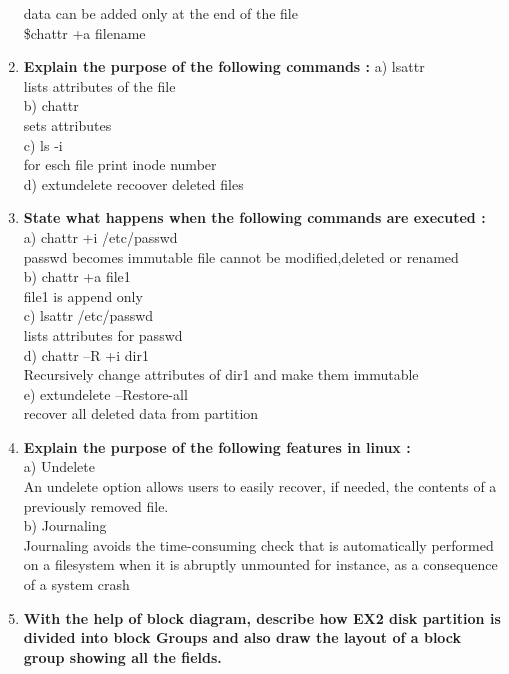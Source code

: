 \documentclass[a4paper,12pt]{article}
\begin{document}
\begin{flushleft}
\begin{enumerate}
{\color{red}data can be added only at the end of the file\\
\$chattr +a filename}\\
\item \textbf{ Explain the purpose of the following commands :}
a) lsattr\\
{\color{red}lists attributes of the file}\\
 b) chattr \\
 {\color{red}sets attributes}\\
c) ls -i\\
{\color{red}for esch file print inode number}\\
 d) extundelete
{\color{red}recoover deleted files}\\
\item \textbf{ State what happens when the following commands are executed :}\\
a) chattr +i /etc/passwd
\\{\color{red}passwd becomes immutable file cannot be modified,deleted or renamed}\\
b) chattr +a file1
\\{\color{red}file1 is append only}\\
c) lsattr /etc/passwd
\\{\color{red}lists attributes for passwd}\\
d) chattr –R +i dir1
\\{\color{red}Recursively change attributes of dir1 and make them immutable}\\
e) extundelete –Restore-all
\\{\color{red}recover all deleted data from partition}\\
\item \textbf{ Explain the purpose of the following features in linux :}\\
a) Undelete \\
{\color{red}An undelete option allows users to easily recover, if needed, the
contents of a previously removed file.
}\\
b) Journaling\\
{\color{red}Journaling avoids the time-consuming check that is automatically
performed on a filesystem when it is abruptly unmounted for instance,
as a consequence of a system crash
}\\
\item \textbf{ With the help of block diagram, describe how EX2 disk partition is divided into block Groups and also draw the layout of a block group showing all the fields.}\\


\end{enumerate}
\end{flushleft}
\end{document}
